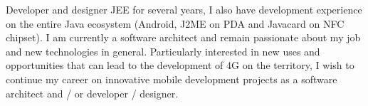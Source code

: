 
\par{
Developer and designer JEE for several years, I also have development experience on the entire Java ecosystem (Android, J2ME on PDA and Javacard on NFC chipset). I am currently a software architect and remain passionate about my job and new technologies in general. Particularly interested in new uses and opportunities that can lead to the development of 4G on the territory, I wish to continue my career on innovative mobile development projects as a software architect and / or developer / designer.
}